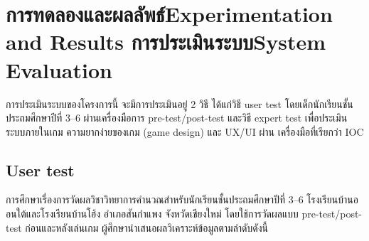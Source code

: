 \chapter{\ifproject%
\ifcpe การทดลองและผลลัพธ์\else Experimentation and Results\fi
\else%
\ifcpe การประเมินระบบ\else System Evaluation\fi
\fi} \label{eval}

การประเมินระบบของโครงการนี้ จะมีการประเมินอยู่ 2 วิธี ได้แก่วิธี user test โดยเด็กนักเรียนชั้นประถมศึกษาปีที่ 3--6 ผ่านเครื่องมือการ pre-test/post-test และวิธี expert test เพื่อประเมินระบบภายในเกม ความยากง่ายของเกม (game design) และ UX/UI ผ่าน
เครื่องมือที่เรียกว่า IOC

\section{User test}
การศึกษาเรื่องการวัดผลวิชาวิทยาการคำนวณสำหรับนักเรียนชั้นประถมศึกษาปีที่ 3--6 
โรงเรียนบ้านออนใต้และโรงเรียนบ้านโฮ้ง อำเภอสันกำแพง
 จังหวัดเชียงใหม่ โดยใช้การวัดผลแบบ pre-test/post-test ก่อนและหลังเล่นเกม ผู้ศึกษานำเสนอผลวิเคราะห์ข้อมูลตามลำดับดังนี้

